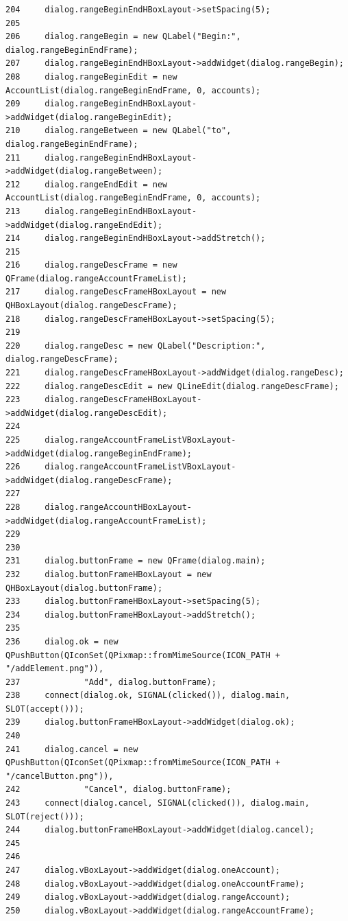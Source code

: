 \begin{verbatim}
204     dialog.rangeBeginEndHBoxLayout->setSpacing(5);
205     
206     dialog.rangeBegin = new QLabel("Begin:", dialog.rangeBeginEndFrame);
207     dialog.rangeBeginEndHBoxLayout->addWidget(dialog.rangeBegin);
208     dialog.rangeBeginEdit = new AccountList(dialog.rangeBeginEndFrame, 0, accounts);
209     dialog.rangeBeginEndHBoxLayout->addWidget(dialog.rangeBeginEdit);
210     dialog.rangeBetween = new QLabel("to", dialog.rangeBeginEndFrame);
211     dialog.rangeBeginEndHBoxLayout->addWidget(dialog.rangeBetween);
212     dialog.rangeEndEdit = new AccountList(dialog.rangeBeginEndFrame, 0, accounts);
213     dialog.rangeBeginEndHBoxLayout->addWidget(dialog.rangeEndEdit);
214     dialog.rangeBeginEndHBoxLayout->addStretch();
215     
216     dialog.rangeDescFrame = new QFrame(dialog.rangeAccountFrameList);
217     dialog.rangeDescFrameHBoxLayout = new QHBoxLayout(dialog.rangeDescFrame);
218     dialog.rangeDescFrameHBoxLayout->setSpacing(5);
219     
220     dialog.rangeDesc = new QLabel("Description:", dialog.rangeDescFrame);
221     dialog.rangeDescFrameHBoxLayout->addWidget(dialog.rangeDesc);
222     dialog.rangeDescEdit = new QLineEdit(dialog.rangeDescFrame);
223     dialog.rangeDescFrameHBoxLayout->addWidget(dialog.rangeDescEdit);
224     
225     dialog.rangeAccountFrameListVBoxLayout->addWidget(dialog.rangeBeginEndFrame);
226     dialog.rangeAccountFrameListVBoxLayout->addWidget(dialog.rangeDescFrame);
227     
228     dialog.rangeAccountHBoxLayout->addWidget(dialog.rangeAccountFrameList);
229     
230         
231     dialog.buttonFrame = new QFrame(dialog.main);
232     dialog.buttonFrameHBoxLayout = new QHBoxLayout(dialog.buttonFrame);
233     dialog.buttonFrameHBoxLayout->setSpacing(5);
234     dialog.buttonFrameHBoxLayout->addStretch();
235     
236     dialog.ok = new QPushButton(QIconSet(QPixmap::fromMimeSource(ICON_PATH + "/addElement.png")),
237             "Add", dialog.buttonFrame);
238     connect(dialog.ok, SIGNAL(clicked()), dialog.main, SLOT(accept()));
239     dialog.buttonFrameHBoxLayout->addWidget(dialog.ok);
240     
241     dialog.cancel = new QPushButton(QIconSet(QPixmap::fromMimeSource(ICON_PATH + "/cancelButton.png")),
242             "Cancel", dialog.buttonFrame);
243     connect(dialog.cancel, SIGNAL(clicked()), dialog.main, SLOT(reject()));
244     dialog.buttonFrameHBoxLayout->addWidget(dialog.cancel);
245     
246     
247     dialog.vBoxLayout->addWidget(dialog.oneAccount);
248     dialog.vBoxLayout->addWidget(dialog.oneAccountFrame);
249     dialog.vBoxLayout->addWidget(dialog.rangeAccount);
250     dialog.vBoxLayout->addWidget(dialog.rangeAccountFrame);

\end{verbatim}
